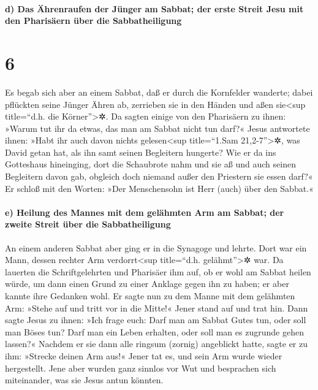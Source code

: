 \hypertarget{d-das-uxe4hrenraufen-der-juxfcnger-am-sabbat-der-erste-streit-jesu-mit-den-pharisuxe4ern-uxfcber-die-sabbatheiligung}{%
\paragraph{d) Das Ährenraufen der Jünger am Sabbat; der erste Streit
Jesu mit den Pharisäern über die
Sabbatheiligung}\label{d-das-uxe4hrenraufen-der-juxfcnger-am-sabbat-der-erste-streit-jesu-mit-den-pharisuxe4ern-uxfcber-die-sabbatheiligung}}

\hypertarget{section-5}{%
\section{6}\label{section-5}}

 Es begab sich aber an einem Sabbat, daß er durch die
Kornfelder wanderte; dabei pflückten seine Jünger Ähren ab, zerrieben
sie in den Händen und aßen sie\textless sup title=``d.h. die
Körner''\textgreater✲.  Da sagten einige von den
Pharisäern zu ihnen: »Warum tut ihr da etwas, das man am Sabbat nicht
tun darf?«  Jesus antwortete ihnen: »Habt ihr auch davon
nichts gelesen\textless sup title=``1.Sam 21,2-7''\textgreater✲, was
David getan hat, als ihn samt seinen Begleitern hungerte? 
Wie er da ins Gotteshaus hineinging, dort die Schaubrote nahm und sie aß
und auch seinen Begleitern davon gab, obgleich doch niemand außer den
Priestern sie essen darf?«  Er schloß mit den Worten: »Der
Menschensohn ist Herr (auch) über den Sabbat.«

\hypertarget{e-heilung-des-mannes-mit-dem-geluxe4hmten-arm-am-sabbat-der-zweite-streit-uxfcber-die-sabbatheiligung}{%
\paragraph{e) Heilung des Mannes mit dem gelähmten Arm am Sabbat; der
zweite Streit über die
Sabbatheiligung}\label{e-heilung-des-mannes-mit-dem-geluxe4hmten-arm-am-sabbat-der-zweite-streit-uxfcber-die-sabbatheiligung}}

 An einem anderen Sabbat aber ging er in die Synagoge und
lehrte. Dort war ein Mann, dessen rechter Arm verdorrt\textless sup
title=``d.h. gelähmt''\textgreater✲ war.  Da lauerten die
Schriftgelehrten und Pharisäer ihm auf, ob er wohl am Sabbat heilen
würde, um dann einen Grund zu einer Anklage gegen ihn zu haben;
 er aber kannte ihre Gedanken wohl. Er sagte nun zu dem
Manne mit dem gelähmten Arm: »Stehe auf und tritt vor in die Mitte!«
Jener stand auf und trat hin.  Dann sagte Jesus zu ihnen:
»Ich frage euch: Darf man am Sabbat Gutes tun, oder soll man Böses tun?
Darf man ein Leben erhalten, oder soll man es zugrunde gehen lassen?«
 Nachdem er sie dann alle ringsum (zornig) angeblickt
hatte, sagte er zu ihm: »Strecke deinen Arm aus!« Jener tat es, und sein
Arm wurde wieder hergestellt.  Jene aber wurden ganz
sinnlos vor Wut und besprachen sich miteinander, was sie Jesus antun
könnten.


